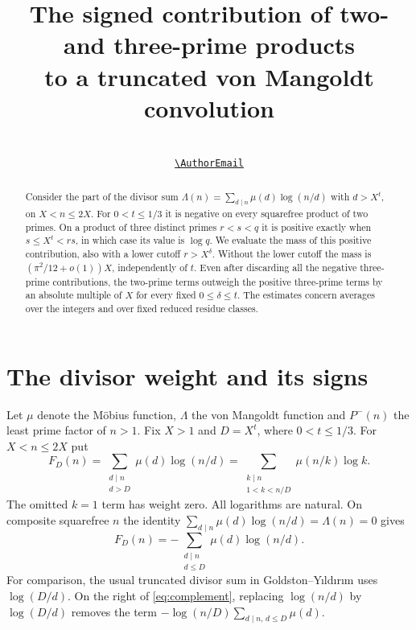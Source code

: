 \documentclass[11pt]{article}
\title{The signed contribution of two- and three-prime products\\
to a truncated von Mangoldt convolution}
\author{\AuthorName\ifx\AuthorEmail\empty\else
  \ifx\AuthorName\empty\else\\\fi
  {\small\href{mailto:\AuthorEmail}{\expandafter\nolinkurl\expandafter{\AuthorEmail}}}\fi}
\date{}
\begin{document}
\maketitle
\begin{abstract}
Consider the part of the divisor sum
\(\Lambda(n)=\sum_{d\mid n}\mu(d)\log(n/d)\) with \(d>X^t\), on
\(X<n\le 2X\). For \(0<t\le 1/3\) it is negative on every squarefree
product of two primes. On a product of three distinct primes \(r<s<q\)
it is positive exactly when \(s\le X^t<rs\), in which case its value
is \(\log q\). We evaluate the mass of this positive contribution,
also with a lower cutoff \(r>X^\delta\). Without the lower cutoff the
mass is \((\pi^2/12+o(1))X\), independently of \(t\). Even after
discarding all the negative three-prime contributions, the two-prime
terms outweigh the positive three-prime terms by an absolute multiple
of \(X\) for every fixed \(0\le\delta\le t\). The estimates concern
averages over the integers and over fixed reduced residue classes.
\end{abstract}

\section{The divisor weight and its signs}

Let \(\mu\) denote the M\"obius function, \(\Lambda\) the von Mangoldt
function and \(P^-(n)\) the least prime factor of \(n>1\). Fix \(X>1\)
and \(D=X^t\), where \(0<t\le 1/3\). For \(X<n\le 2X\) put
\begin{equation}\label{eq:weight}
 F_D(n)=\sum_{\substack{d\mid n\\ d>D}}\mu(d)\log(n/d)
       =\sum_{\substack{k\mid n\\1<k<n/D}}\mu(n/k)\log k.
\end{equation}
The omitted \(k=1\) term has weight zero. All logarithms are natural.
On composite squarefree \(n\) the identity
\(\sum_{d\mid n}\mu(d)\log(n/d)=\Lambda(n)=0\) gives
\begin{equation}\label{eq:complement}
 F_D(n)=-\sum_{\substack{d\mid n\\d\le D}}\mu(d)\log(n/d).
\end{equation}
For comparison, the usual truncated divisor sum in
Goldston--Y{\i}ld{\i}r{\i}m \cite{GY} uses \(\log(D/d)\).
On the right of \eqref{eq:complement}, replacing \(\log(n/d)\) by
\(\log(D/d)\) removes the term
\(-\log(n/D)\sum_{d\mid n,\,d\le D}\mu(d)\).
\end{document}
